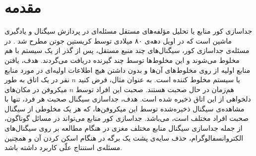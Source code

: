 \documentclass[oneside]{thesis}
\begin{document}
\chapter{مقدمه}

جداسازی کور منابع 
یا 
تحلیل مؤلفه‌های مستقل
مسئله‌ای  در پردازش سیگنال و یادگیری ماشین است که در اویل دهه‌ی ۸۰ میلادی توسط کریستین جوتن  مطرح شد
\cite{historicalnotes}. 
در مسئله‌ی جداسازی کور، سیگنال‌های چند منبع مستقل، پس از گذر از یک سیستم با هم مخلوط می‌شوند و این مخلوط‌ها توسط چند گیرنده دریافت می‌گردند. هدف، یافتن منابع اولیه از روی مخلوط‌های آن‌ها و بدون داشتن هیچ اطلاعات اولیه‌ای در مورد منابع یا سیستم مخلوط کننده است. به عنوان مثال،  فرض کنید $n$ نفر در یک اتاق به طور هم‌زمان در حال صحبت هستند.  صحبت این افراد توسط $n$ میکروفن در مکان‌های دلخواهی از این اتاق ذخیره شده است. هدف، جداسازی سیگنال صحبت هر فرد، تنها با مشاهده‌ی سیگنال ذخیره‌شده توسط این میکروفن‌ها، که هر یک مخلوطی از سیگنال صحبت افراد مختلف است، می‌باشد. جداسازی کور منابع می‌تواند در مسائل گوناگون، از جمله جداسازی سیگنال منابع مختلف مغزی در هنگام مطالعه بر روی سیگنال‌های الکتروانسفالوگرام، حذف سایه‌ی پشت یک برگه در هنگام اسکن کردن آن و همچنین مسئله‌ی استنتاج علّی کاربرد داشته باشد.
\end{document}
